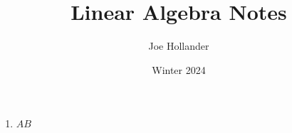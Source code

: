 \documentclass{article}
\title{Linear Algebra Notes}
\author{Joe Hollander}
\date{Winter 2024}
\begin{document}
\maketitle 

\begin{enumerate}
    \item $AB$
\end{enumerate}
\end{document}
